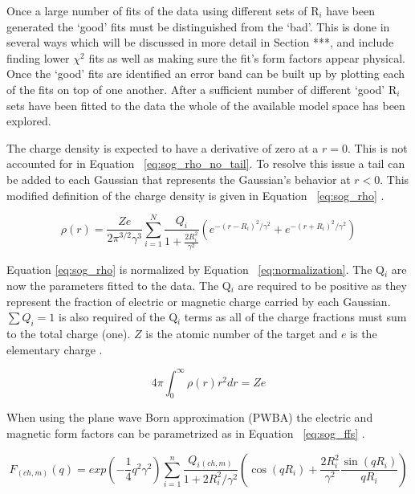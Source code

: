 Once a large number of fits of the data using different sets of R$_i$ have been generated the `good' fits must be distinguished from the `bad'. This is done in several ways which will be discussed in more detail in Section ***, and include finding lower $\chi^2$ fits as well as making sure the fit's form factors appear physical. Once the `good' fits are identified an error band can be built up by plotting each of the fits on top of one another. After a sufficient number of different `good' R$_i$ sets have been fitted to the data the whole of the available model space has been explored. 

The charge density is expected to have a derivative of zero at a $r=0$. This is not accounted for in Equation ~\ref{eq:sog_rho_no_tail}. To resolve this issue a tail can be added to each Gaussian that represents the Gaussian's behavior at $r<0$. This modified definition of the charge density is given in Equation ~\ref{eq:sog_rho} \cite{Article:SOG}.

\begin{equation} \label{eq:sog_rho}
	\rho(r) = \frac{Ze}{2 \pi^{3/2}\gamma^3} \sum_{i=1}^N \frac{Q_i}{1+\frac{2R_i^2}{\gamma^2}} \left( e^{-\left( r-R_i \right)^2/\gamma^2} + e^{-\left( r+R_i \right)^2/\gamma^2} \right)
\end{equation}

\noindent Equation \ref{eq:sog_rho} is normalized by Equation ~\ref{eq:normalization}. The Q$_i$ are now the parameters fitted to the data. The Q$_i$ are required to be positive as they represent the fraction of electric or magnetic charge carried by each Gaussian. $\sum Q_i=1$ is also required of the Q$_i$ terms as all of the charge fractions must sum to the total charge (one). $Z$ is the atomic number of the target and $e$ is the elementary charge \cite{Article:SOG}.

\begin{equation} \label{eq:normalization}
	4 \pi \int_0^{\infty} \rho(r) r^2 dr = Ze
\end{equation}

When using the plane wave Born approximation (PWBA) the electric and magnetic form factors can be parametrized as in Equation ~\ref{eq:sog_ffs} \cite{Article:SOG}.

\begin{equation} \label{eq:sog_ffs}
	F_{(ch,m)}(q) = exp \left(-\frac{1}{4} q^2 \gamma^2 \right) \sum^{n}_{i=1} \frac{Q_i{_{(ch,m)}}}{1+2R^2_i/\gamma^2} \left( \cos(qR_i) + \frac{2R^2_i}{\gamma^2} \frac{\sin(qR_i)}{qR_i} \right)
\end{equation}

